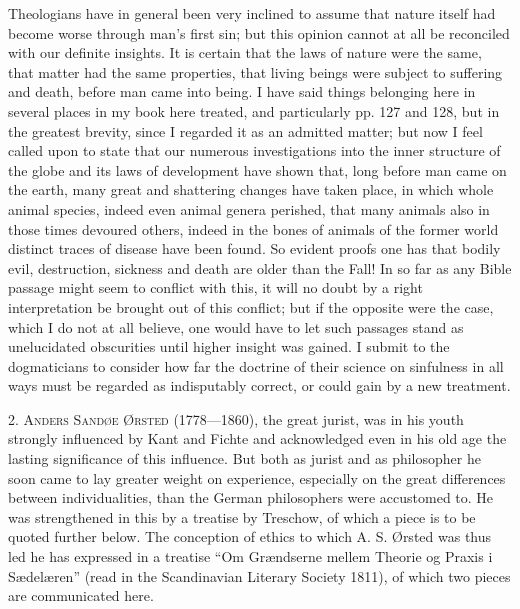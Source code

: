 \documentclass[12pt,a4paper,openany]{book}
\newcommand{\opage}[1]{\marginnote{\footnotesize\textit{[#1]}}}
\newenvironment{intro}{\par}{\par}
\begin{document}
Theologians have in general been very inclined to assume that nature itself had
become worse through man's first sin; but this opinion cannot at all be reconciled
with our definite insights. It is certain that the laws of nature were the same, that
matter had the same properties, that living beings were subject to suffering and
death, before man came into being. I have said things belonging here in several
places in my book here treated, and particularly pp. 127 and 128, but in the greatest
brevity, since I regarded it as an admitted matter; but now I feel called upon to
state that our numerous investigations into the inner structure of the globe and its
laws of development have shown that, long before man came on the earth, many great
and shattering changes have taken place, in which whole animal species, indeed even
animal genera
\setcounter{footnote}{0}%
\opage{80}perished, that many animals also in those times devoured others, indeed in the
bones of animals of the former world distinct traces of disease have been found. So
evident proofs one has that bodily evil, destruction, sickness and death are older
than the Fall! In so far as any Bible passage might seem to conflict with this, it
will no doubt by a right interpretation be brought out of this conflict; but if the
opposite were the case, which I do not at all believe, one would have to let such
passages stand as unelucidated obscurities until higher insight was gained. I submit
to the dogmaticians to consider how far the doctrine of their science on sinfulness
in all ways must be regarded as indisputably correct, or could gain by a new
treatment.

\begin{intro}

2. \textsc{Anders Sandøe Ørsted} (1778---1860), the great jurist, was in his youth
strongly influenced by Kant and Fichte and acknowledged even in his old age the
lasting significance of this influence. But both as jurist and as philosopher he
soon came to lay greater weight on experience, especially on the great differences
between individualities, than the German philosophers were accustomed to. He was
strengthened in this by a treatise by Treschow, of which a piece is to be quoted
further below. The conception of ethics to which A. S. Ørsted was thus led he has
expressed in a treatise ``Om Grændserne mellem Theorie og Praxis i Sædelæren''
(read in the Scandinavian Literary Society 1811), of which two pieces are
communicated here.
\end{intro}
\end{document}
